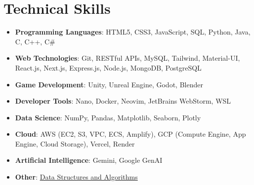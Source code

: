 \documentclass[letterpaper,11pt]{article}
\newcommand{\resumeItem}[1]{
  \item\small{#1 \vspace{-2pt}}
}
\newcommand{\resumeSubHeadingListStart}{\begin{itemize}[leftmargin=0.15in, label={}]}
\newcommand{\resumeSubHeadingListEnd}{\end{itemize}}
\begin{document}
\section{Technical Skills}
\resumeSubHeadingListStart
  \resumeItem{\textbf{Programming Languages}: HTML5, CSS3, JavaScript, SQL, Python, Java, C, C++, C\#}
  \resumeItem{\textbf{Web Technologies}: Git, RESTful APIs, MySQL, Tailwind, Material-UI, React.js, Next.js, Express.js, Node.js, MongoDB, PostgreSQL}
  \resumeItem{\textbf{Game Development}: Unity, Unreal Engine, Godot, Blender}
  \resumeItem{\textbf{Developer Tools}: Nano, Docker, Neovim, JetBrains WebStorm, WSL}
  \resumeItem{\textbf{Data Science}: NumPy, Pandas, Matplotlib, Seaborn, Plotly}
  \resumeItem{\textbf{Cloud}: AWS (EC2, S3, VPC, ECS, Amplify), GCP (Compute Engine, App Engine, Cloud Storage), Vercel, Render}
  \resumeItem{\textbf{Artificial Intelligence}: Gemini, Google GenAI}
  \resumeItem{\textbf{Other}: \href{https://github.com/abhay-byte/DSA_Practice}{Data Structures and Algorithms}} 
\resumeSubHeadingListEnd

\end{document}
